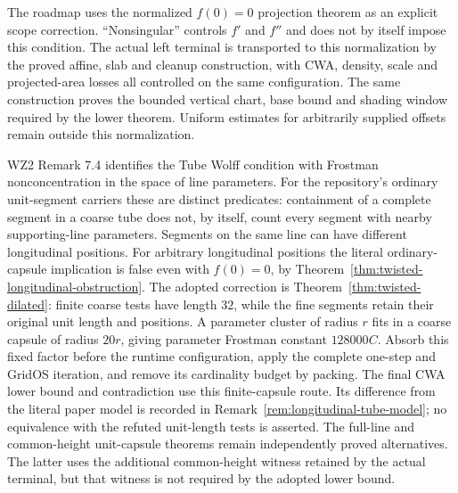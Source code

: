\begin{remark}
\label{rem:parameter-frostman}
The roadmap uses the normalized $f(0)=0$ projection theorem as an explicit
scope correction. ``Nonsingular'' controls $f'$ and $f''$ and does not by
itself impose this condition. The actual left terminal is transported to
this normalization by the proved affine, slab and cleanup construction,
with CWA, density, scale and projected-area losses all controlled on the
same configuration. The same construction proves the bounded vertical
chart, base bound and shading window required by the lower theorem.
Uniform estimates for arbitrarily supplied offsets remain outside this
normalization.

WZ2 Remark 7.4 identifies the Tube Wolff condition with Frostman
nonconcentration in the space of line parameters. For the repository's
ordinary unit-segment carriers these are distinct predicates:
containment of a complete segment in a coarse tube does not, by itself,
count every segment with nearby supporting-line parameters. Segments
on the same line can have different longitudinal positions.
For arbitrary longitudinal positions the literal ordinary-capsule
implication is false even with $f(0)=0$, by
Theorem~\ref{thm:twisted-longitudinal-obstruction}.
The adopted correction is Theorem~\ref{thm:twisted-dilated}: finite
coarse tests have length $32$, while the fine segments retain their
original unit length and positions. A parameter cluster of radius $r$
fits in a coarse capsule of radius $20r$, giving parameter Frostman
constant $128000C$. Absorb this fixed factor before the runtime
configuration, apply the complete one-step and GridOS iteration,
and remove its cardinality budget by packing.
The final CWA lower bound and contradiction use this finite-capsule
route. Its difference from the literal paper model is recorded in
Remark~\ref{rem:longitudinal-tube-model}; no equivalence with the
refuted unit-length tests is asserted.
The full-line and common-height unit-capsule theorems remain independently
proved alternatives. The latter uses the additional common-height witness
retained by the actual terminal, but that witness is not required by the
adopted lower bound.
\end{remark}

